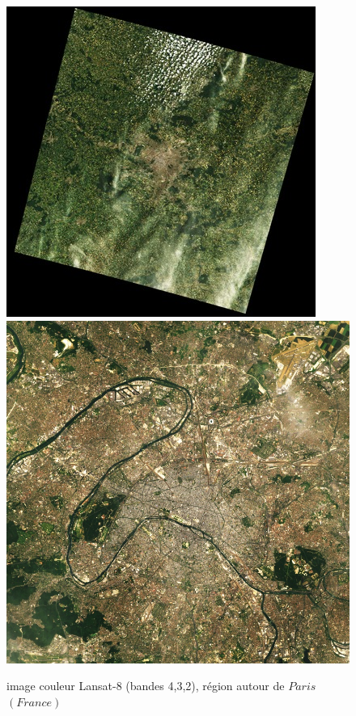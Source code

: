 \documentclass{book}
\begin{document}
\begin{figure}[H]
\begin{center}
\includegraphics[scale=0.8]{LC81990262015158LGN00_color.jpg}
\includegraphics[scale=0.35]{LC81990262015158LGN00_color_idf.jpg}
\end{center}
\caption{image couleur Lansat-8 (bandes 4,3,2), région autour de $Paris$ $(France)$}
\label{color}
\end{figure}
\end{document}
